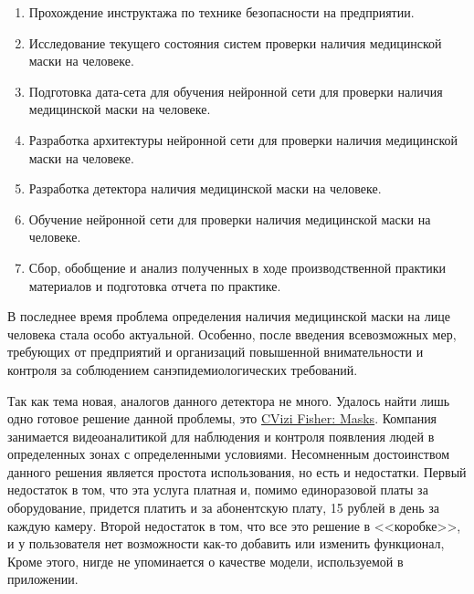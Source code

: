 \documentclass[a4paper,14pt]{article}
\begin{document}
\begin{enumerate}
	
	\item Прохождение инструктажа по технике безопасности на предприятии.
	
	\item Исследование текущего состояния систем проверки наличия медицинской маски на человеке.
	
	\item Подготовка дата-сета для обучения нейронной сети для проверки наличия медицинской маски на человеке.
	
	\item Разработка архитектуры нейронной сети для проверки наличия медицинской маски на человеке.
	
	\item Разработка детектора наличия медицинской маски на человеке.
	
	\item Обучение нейронной сети для проверки наличия медицинской маски на человеке.
	
	\item Сбор, обобщение и анализ полученных в ходе производственной практики материалов и подготовка отчета по практике.
	
\end{enumerate}

В последнее время проблема определения наличия медицинской маски на лице человека стала особо актуальной.
Особенно, после введения всевозможных мер, требующих от предприятий и организаций повышенной внимательности и контроля за соблюдением санэпидемиологических требований.

Так как тема новая, аналогов данного детектора не много.
Удалось найти лишь одно готовое решение данной проблемы, это \href{https://fisher.cvizi.com/#solutions}{CVizi Fisher: Masks}.
Компания занимается видеоаналитикой для наблюдения и контроля появления людей в определенных зонах с определенными условиями. 
Несомненным достоинством данного решения является простота использования, но есть и недостатки.
Первый недостаток в том, что эта услуга платная и, помимо единоразовой платы за оборудование, придется платить и за абонентскую плату, 15 рублей в день за каждую камеру.
Второй недостаток в том, что все это решение в <<коробке>>, и у пользователя нет возможности как-то добавить или изменить функционал,
Кроме этого, нигде не упоминается о качестве модели, используемой в приложении.
\end{document}
